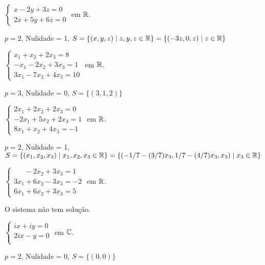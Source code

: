 \documentclass[12pt]{exam}
\begin{document}
\begin{exercicio}
  $
    \begin{cases}
      x - 2y + 3z = 0\\
      2x + 5y + 6z = 0
    \end{cases}
  $
  em $\mathbb{R}$.
  \begin{solucao}
    $p = 2$, Nulidade = 1, $S = \{(x, y, z) \mid z, y, z \in \mathbb{R}\} = \{(-3z, 0, z) \mid z \in \mathbb{R}\}$
  \end{solucao}
\end{exercicio}

\begin{exercicio}
  $
    \begin{cases}
      x_1 + x_2 + 2x_3 = 8\\
      -x_1 - 2x_2 + 3x_3 = 1\\
      3x_1 - 7x_2 + 4x_3 = 10
    \end{cases}
  $
  em $\mathbb{R}$.
  \begin{solucao}
    $p = 3$, Nulidade = 0, $S = \{(3, 1, 2)\}$
  \end{solucao}
\end{exercicio}

\begin{exercicio}
  $
    \begin{cases}
      2x_1 + 2x_2 + 2x_3 = 0\\
      -2x_1 + 5x_2 + 2x_3 = 1\\
      8x_1 + x_2 + 4x_3 = -1
    \end{cases}
  $
  em $\mathbb{R}$.
  \begin{solucao}
    $p = 2$, Nulidade = 1, $S = \{(x_1, x_2, x_3) \mid x_1, x_2, x_3 \in \mathbb{R}\} = \{(-1/7 - (3/7)x_3, 1/7 - (4/7)x_3, x_3) \mid x_3 \in \mathbb{R}\}$
  \end{solucao}
\end{exercicio}

\begin{exercicio}
  $
    \begin{cases}
      \phantom{2x_1} - 2x_2 + 3x_3 = 1\\
      3x_1 + 6x_2 - 3x_3 = -2\\
      6x_1 + 6x_2 + 3x_3 = 5
    \end{cases}
  $
  em $\mathbb{R}$.
  \begin{solucao}
    O sistema n\~ao tem solu\c{c}\~ao.
  \end{solucao}
\end{exercicio}

\begin{exercicio}\label{sistema_linear_eliminacao}
  $
    \begin{cases}
      ix + iy = 0\\
      2ix - y = 0\\
    \end{cases}
  $
  em $\mathbb{C}$.
  \begin{solucao}
    $p = 2$, Nulidade = 0, $S = \{(0, 0)\}$
  \end{solucao}
\end{exercicio}
\end{document}
